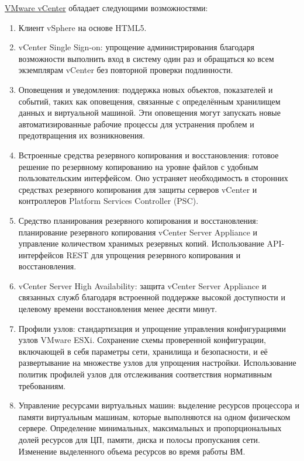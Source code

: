 \documentclass[14pt, a4paper]{article}
\begin{document}
\href{https://www.vmware.com/content/dam/digitalmarketing/vmware/ru/pdf/products/vCenter/vmw-datasheetvcenter.pdf}{VMware vCenter} обладает следующими возможностями:
\begin{enumerate}
    \item Клиент vSphere на основе HTML5.
    \item vCenter Single Sign-on: упрощение администрирования благодаря возможности выполнить
    вход в систему один раз и обращаться ко всем экземплярам vCenter без повторной проверки
    подлинности.
    \item Оповещения и уведомления: поддержка новых объектов, показателей и событий, таких как
    оповещения, связанные с определённым хранилищем данных и виртуальной машиной. Эти
    оповещения могут запускать новые автоматизированные рабочие процессы для устранения
    проблем и предотвращения их возникновения.
    \item Встроенные средства резервного копирования и восстановления: готовое решение по
    резервному копированию на уровне файлов с удобным пользовательским интерфейсом. Оно
    устраняет необходимость в сторонних средствах резервного копирования для защиты
    серверов vCenter и контроллеров Platform Services Controller (PSC).
    \item Средство планирования резервного копирования и восстановления: планирование резервного
    копирования vCenter Server Appliance и управление количеством хранимых резервных копий.
    Использование API-интерфейсов REST для упрощения резервного копирования и
    восстановления.
    \item vCenter Server High Availability: защита vCenter Server Appliance и связанных служб благодаря
    встроенной поддержке высокой доступности и целевому времени восстановления менее
    десяти минут.
    \item Профили узлов: стандартизация и упрощение управления конфигурациями узлов VMware
    ESXi. Сохранение схемы проверенной конфигурации, включающей в себя параметры сети,
    хранилища и безопасности, и её развертывание на множестве узлов для упрощения
    настройки. Использование политик профилей узлов для отслеживания соответствия
    нормативным требованиям.
    \item Управление ресурсами виртуальных машин: выделение ресурсов процессора и памяти
    виртуальным машинам, которые выполняются на одном физическом сервере. Определение
    минимальных, максимальных и пропорциональных долей ресурсов для ЦП, памяти, диска и
    полосы пропускания сети. Изменение выделенного объема ресурсов во время работы ВМ.

\end{enumerate}
\end{document}
